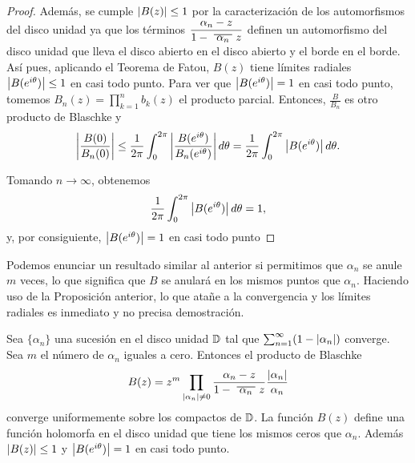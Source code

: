 \begin{proof}
    Además, se cumple $\left\lvert B(z)\right\rvert \leq 1$ por la caracterización de los automorfismos del disco unidad ya que los términos $\dfrac{\alpha_n - z}{1 - \xbar{\alpha_n}z}$ definen un automorfismo del disco unidad que lleva el disco abierto en el disco abierto y el borde en el borde. \\

    Así pues, aplicando el Teorema de Fatou, $B(z)$ tiene límites radiales $\left\lvert B(e^{i\theta})\right\rvert \leq 1$ en casi todo punto. Para ver que $\left\lvert B(e^{i \theta})\right\rvert = 1$ en casi todo punto, tomemos $B_n(z) = \prod_{k=1}^{n} b_k(z)$ el producto parcial. Entonces, $\frac{B}{B_n}$ es otro producto de Blaschke y
    \begin{equation*}
        \left\lvert\frac{B(0)}{B_n(0)}\right\rvert \leq \frac{1}{2 \pi} \int_{0}^{2 \pi} \left\lvert\frac{B(e^{i \theta})}{B_n(e^{i \theta})}\right\rvert d \theta = \frac{1}{2 \pi}  \int_{0}^{2 \pi} \left\lvert B(e^{i \theta})\right\rvert d \theta.
    \end{equation*}

    Tomando $n \to \infty$, obtenemos
    \begin{equation*}
         \frac{1}{2 \pi}  \int_{0}^{2 \pi} \left\lvert B(e^{i \theta})\right\rvert d \theta = 1,
    \end{equation*}
    y, por consiguiente, $\left\lvert B(e^{i \theta})\right\rvert = 1$ en casi todo punto
\end{proof}

Podemos enunciar un resultado similar al anterior si permitimos que $\alpha_n$ se anule $m$ veces, lo que significa que $B$ se anulará en los mismos puntos que $\alpha_n$. Haciendo uso de la Proposición anterior, lo que atañe a la convergencia y los límites radiales es inmediato y no precisa demostración. \\

\begin{corollary}
    Sea $\{\alpha_n\}$ una sucesión en el disco unidad $\mathbb{D}$ tal que $\sum_{n=1}^{\infty} (1 - \left\lvert\alpha_n\right\rvert)$ converge. Sea $m$ el número de $\alpha_n$ iguales a cero. Entonces el producto de Blaschke
\begin{equation*}
    B(z) = z^m \prod_{\abs{\alpha_n} \not = 0} \frac{\alpha_n - z}{1 - \xbar{\alpha_n}z} \dfrac{\abs{\alpha_n}}{\alpha_n}
\end{equation*}
converge uniformemente sobre los compactos de $\mathbb{D}$. La función $B(z)$ define una función holomorfa en el disco unidad que tiene los mismos ceros que $\alpha_n$. Además $\left\lvert B(z)\right\rvert \leq 1$ y $\left\lvert B(e^{i \theta})\right\rvert = 1$ en casi todo punto.
\end{corollary}

